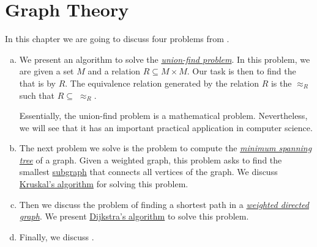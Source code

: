 \chapter{Graph Theory}
In this chapter we are going to discuss four problems from .
\begin{enumerate}[(a)]
\item We present an algorithm to solve the 
      \href{https://en.wikipedia.org/wiki/Disjoint-set_data_structure}{\emph{union-find problem}}.
      In this problem, we are given a set $M$ and a relation $R \subseteq M \times M$.  Our task is
      then to find the  that is  by $R$.  The equivalence relation
      generated by the relation $R$ is the  $\approx_R$ such that $R \subseteq\; \approx_R$.
      
      Essentially, the union-find problem is a mathematical problem.  Nevertheless, we will see that 
      it has an important practical application in computer science. 
\item The next problem we solve is the problem to compute the
      \href{https://en.wikipedia.org/wiki/Minimum_spanning_tree}{\emph{minimum spanning tree}}
      of a graph.  Given a weighted graph, this problem asks to find the smallest 
      \href{https://en.wikipedia.org/wiki/Glossary_of_graph_theory_terms#subgraph}{subgraph} that 
      connects all vertices of the graph.  We discuss
      \href{https://en.wikipedia.org/wiki/Kruskal%27s_algorithm}{Kruskal's algorithm} 
      for solving this problem.  
\item Then we discuss the problem of finding a shortest path in a 
      \href{https://en.wikipedia.org/wiki/Directed_graph}{\emph{weighted directed graph}}.
      We present \href{https://en.wikipedia.org/wiki/Dijkstra%27s_algorithm}{Dijkstra's algorithm} to solve
      this problem.   
\item Finally, we discuss .
\end{enumerate}

